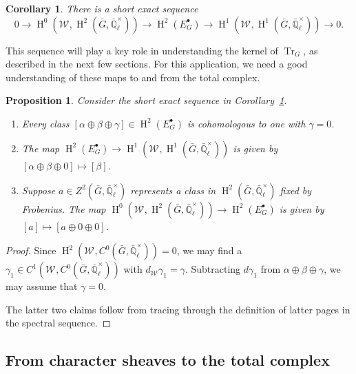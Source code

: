 \documentclass[10pt]{amsart}
\theoremstyle{plain}
\newtheorem{proposition}[theorem]{Proposition}
\newtheorem{corollary}[theorem]{Corollary}
\theoremstyle{definition}
\newcommand{\EE}{\mathbb{\bar Q}_\ell}
\newcommand{\EEx}{\EE^\times}
\newcommand{\Weil}[1]{\mathcal{W}_{#1}}
\DeclareMathOperator{\Hh}{H}
\newcommand{\TrFrob}[1]{\operatorname{Tr}_{#1}}
\newcommand{\bG}{\bar{G}}
\begin{document}
\begin{corollary}\label{cor:spectral_ses}
There is a short exact sequence
 \[
    0 \to
    \Hh^0(\Weil{},\Hh^2(\bG,\EEx)) \to
    \Hh^2(E^\bullet_G) \to
    \Hh^1(\Weil{},\Hh^1(\bG,\EEx)) \to
    0.
 \]
\end{corollary}

This sequence will play a key role in understanding the kernel of $\TrFrob{G}$, as described in the next few sections.
For this application, we need a good understanding of these maps to and from the total complex.

\begin{proposition} \label{prop:ses_desc}
Consider the short exact sequence in Corollary~\ref{cor:spectral_ses}.
\begin{enumerate}
\item Every class $[\alpha\oplus\beta\oplus\gamma] \in \Hh^2(E^\bullet_G)$ is cohomologous to one with $\gamma=0$.
\item The map $\Hh^2(E^\bullet_G) \to \Hh^1(\Weil{},\Hh^1(\bG,\EEx))$ is given by $[\alpha\oplus\beta\oplus 0] \mapsto [\beta]$.
\item Suppose $a \in Z^2(\bG, \EEx)$ represents a class in $\Hh^2(\bG,\EEx)$ fixed by Frobenius.
The map $\Hh^0(\Weil{},\Hh^2(\bG,\EEx)) \to \Hh^2(E^\bullet_G)$ is given by $[a] \mapsto [a \oplus 0 \oplus 0]$.
\end{enumerate}
\end{proposition}
\begin{proof}
Since $\Hh^2(\Weil{}, C^0(\bG, \EEx)) = 0$, we may find a $\gamma_1 \in C^1(\Weil{}, C^0(\bG, \EEx))$ with $d_{\Weil{}}\gamma_1 = \gamma$.
Subtracting $d \gamma_1$ from $\alpha\oplus\beta\oplus\gamma$, we may assume that $\gamma = 0$.

The latter two claims follow from tracing through the definition of latter pages in the spectral sequence.
\end{proof}

\subsection{From character sheaves to the total complex}\label{ssec:S}
\end{document}
